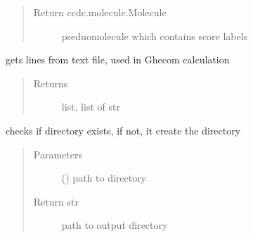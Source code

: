 \documentclass[letterpaper,10pt,english]{sphinxmanual}
\begin{document}
\begin{fulllineitems}
\begin{fulllineitems}
\begin{quote}
\begin{description}
\item[{Return ccdc.molecule.Molecule}] \leavevmode
pseduomolecule which contains score labels

\end{description}\end{quote}

\end{fulllineitems}


\begin{fulllineitems}
\label{\detokenize{hs_utilities_api:hotspots.hs_utilities.Helper.get_lines_from_file}}
gets lines from text file, used in Ghecom calculation
\begin{quote}\begin{description}
\item[{Returns}] \leavevmode
list, list of str

\end{description}\end{quote}

\end{fulllineitems}


\begin{fulllineitems}
\label{\detokenize{hs_utilities_api:hotspots.hs_utilities.Helper.get_out_dir}}
checks if directory exists, if not, it create the directory
\begin{quote}\begin{description}
\item[{Parameters}] \leavevmode
{} () \textendash{} path to directory

\item[{Return str}] \leavevmode
path to output directory

\end{description}\end{quote}

\end{fulllineitems}


\end{fulllineitems}
\end{document}
